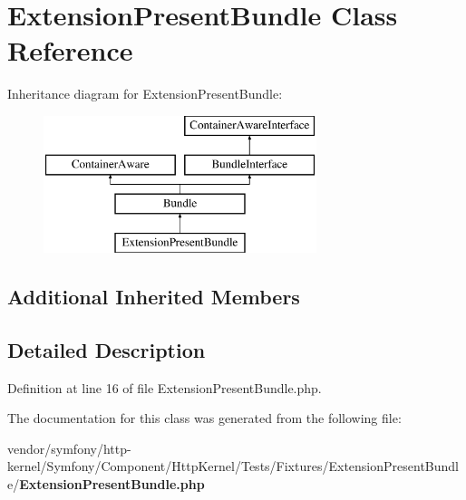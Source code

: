 \section{Extension\+Present\+Bundle Class Reference}
\label{class_symfony_1_1_component_1_1_http_kernel_1_1_tests_1_1_fixtures_1_1_extension_present_bundle_1_1_extension_present_bundle}
Inheritance diagram for Extension\+Present\+Bundle\+:\begin{figure}[H]
\begin{center}
\leavevmode
\includegraphics[height=4.000000cm]{class_symfony_1_1_component_1_1_http_kernel_1_1_tests_1_1_fixtures_1_1_extension_present_bundle_1_1_extension_present_bundle}
\end{center}
\end{figure}
\subsection*{Additional Inherited Members}


\subsection{Detailed Description}


Definition at line 16 of file Extension\+Present\+Bundle.\+php.



The documentation for this class was generated from the following file\+:\begin{DoxyCompactItemize}
\item 
vendor/symfony/http-\/kernel/\+Symfony/\+Component/\+Http\+Kernel/\+Tests/\+Fixtures/\+Extension\+Present\+Bundle/{\bf Extension\+Present\+Bundle.\+php}\end{DoxyCompactItemize}
